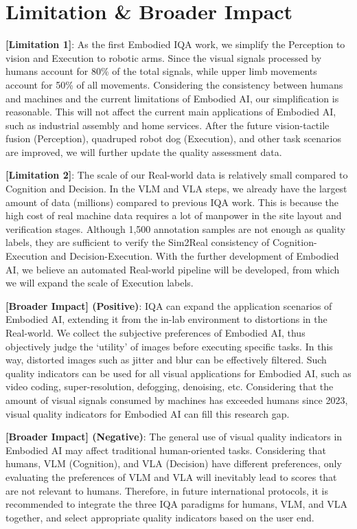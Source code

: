 \documentclass{article}
\begin{document}
\section{Limitation \& Broader Impact}
\textbf{[Limitation 1]}: As the first Embodied IQA work, we simplify the Perception to vision and Execution to robotic arms. Since the visual signals processed by humans account for 80\% of the total signals, while upper limb movements account for 50\% of all movements. Considering the consistency between humans and machines and the current limitations of Embodied AI, our simplification is reasonable. This will not affect the current main applications of Embodied AI, such as industrial assembly and home services. After the future vision-tactile fusion (Perception), quadruped robot dog (Execution), and other task scenarios are improved, we will further update the quality assessment data.

\textbf{[Limitation 2]}: The scale of our Real-world data is relatively small compared to Cognition and Decision. In the VLM and VLA steps, we already have the largest amount of data (millions) compared to previous IQA work. This is because the high cost of real machine data requires a lot of manpower in the site layout and verification stages. Although 1,500 annotation samples are not enough as quality labels, they are sufficient to verify the Sim2Real consistency of Cognition-Execution and Decision-Execution. With the further development of Embodied AI, we believe an automated Real-world pipeline will be developed, from which we will expand the scale of Execution labels.

\textbf{[Broader Impact] (Positive)}: IQA can expand the application scenarios of Embodied AI, extending it from the in-lab environment to distortions in the Real-world. We collect the subjective preferences of Embodied AI, thus objectively judge the `utility' of images before executing specific tasks. In this way, distorted images such as jitter and blur can be effectively filtered. Such quality indicators can be used for all visual applications for Embodied AI, such as video coding, super-resolution, defogging, denoising, etc. Considering that the amount of visual signals consumed by machines has exceeded humans since 2023, visual quality indicators for Embodied AI can fill this research gap.

\textbf{[Broader Impact] (Negative)}: The general use of visual quality indicators in Embodied AI may affect traditional human-oriented tasks. Considering that humans, VLM (Cognition), and VLA (Decision) have different preferences, only evaluating the preferences of VLM and VLA will inevitably lead to scores that are not relevant to humans. Therefore, in future international protocols, it is recommended to integrate the three IQA paradigms for humans, VLM, and VLA together, and select appropriate quality indicators based on the user end.
\end{document}
